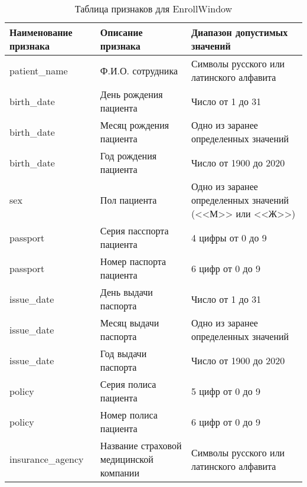 \begin{table}[ht]
\caption{Таблица признаков для EnrollWindow}
\label{tab:tab_3}
\begin{center}
\begin{tabularx}{\linewidth}{|X|X|X|}
\hline
 Наименование признака & Описание признака & Диапазон допустимых значений\\
\hline
 patient\_name & Ф.И.О. сотрудника & Символы русского или латинского алфавита\\
\hline
 birth\_date & День рождения пациента & Число от 1 до 31\\
\hline
 birth\_date & Месяц рождения пациента & Одно из заранее определенных значений\\
\hline
 birth\_date & Год рождения пациента & Число от 1900 до 2020\\
\hline
 sex & Пол пациента & Одно из заранее определенных значений (<<М>> или <<Ж>>)\\
\hline
 passport & Серия пасспорта пациента & 4 цифры от 0 до 9 \\
\hline
 passport & Номер паспорта пациента & 6 цифр от 0 до 9 \\
\hline
 issue\_date & День выдачи паспорта & Число от 1 до 31\\
\hline
 issue\_date & Месяц выдачи паспорта & Одно из заранее определенных значений\\
\hline
 issue\_date & Год выдачи паспорта & Число от 1900 до 2020\\
\hline
 policy & Серия полиса пациента & 5 цифр от 0 до 9 \\
\hline
 policy & Номер полиса пациента & 6 цифр от 0 до 9 \\
\hline
 insurance\_agency & Название страховой медицинской компании & Символы русского или латинского алфавита \\
\hline
\end{tabularx}
\end{center}
\end{table}

\clearpagepage
